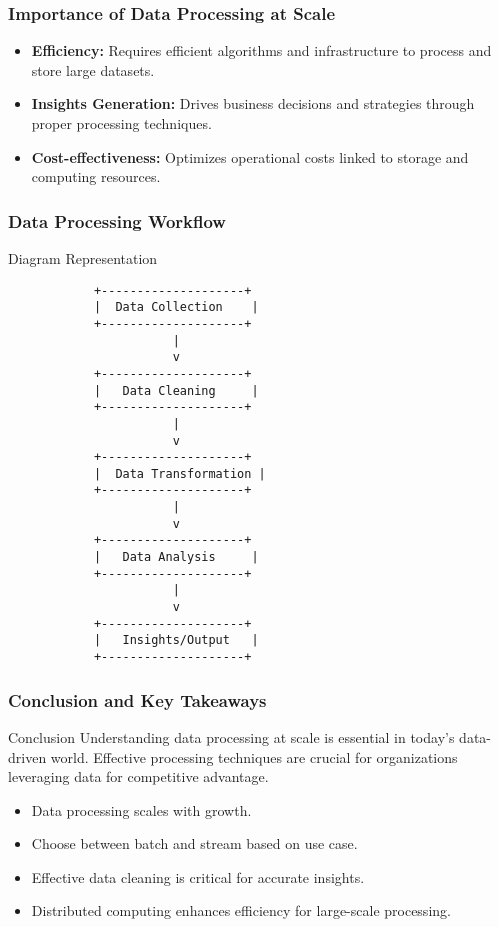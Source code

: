\documentclass[aspectratio=169]{beamer}
\begin{document}
\begin{frame}[fragile]
    \frametitle{Importance of Data Processing at Scale}
    \begin{itemize}
        \item \textbf{Efficiency:} Requires efficient algorithms and infrastructure to process and store large datasets.
        \item \textbf{Insights Generation:} Drives business decisions and strategies through proper processing techniques.
        \item \textbf{Cost-effectiveness:} Optimizes operational costs linked to storage and computing resources.
    \end{itemize}
\end{frame}

\begin{frame}[fragile]
    \frametitle{Data Processing Workflow}
    \begin{block}{Diagram Representation}
        \begin{verbatim}
            +--------------------+
            |  Data Collection    |
            +--------------------+
                       |
                       v
            +--------------------+
            |   Data Cleaning     |
            +--------------------+
                       |
                       v
            +--------------------+
            |  Data Transformation |
            +--------------------+
                       |
                       v
            +--------------------+
            |   Data Analysis     |
            +--------------------+
                       |
                       v
            +--------------------+
            |   Insights/Output   |
            +--------------------+
        \end{verbatim}
    \end{block}
\end{frame}

\begin{frame}[fragile]
    \frametitle{Conclusion and Key Takeaways}
    \begin{block}{Conclusion}
        Understanding data processing at scale is essential in today's data-driven world. Effective processing techniques are crucial for organizations leveraging data for competitive advantage.
    \end{block}
    \begin{itemize}
        \item Data processing scales with growth.
        \item Choose between batch and stream based on use case.
        \item Effective data cleaning is critical for accurate insights.
        \item Distributed computing enhances efficiency for large-scale processing.
    \end{itemize}
\end{frame}
\end{document}
